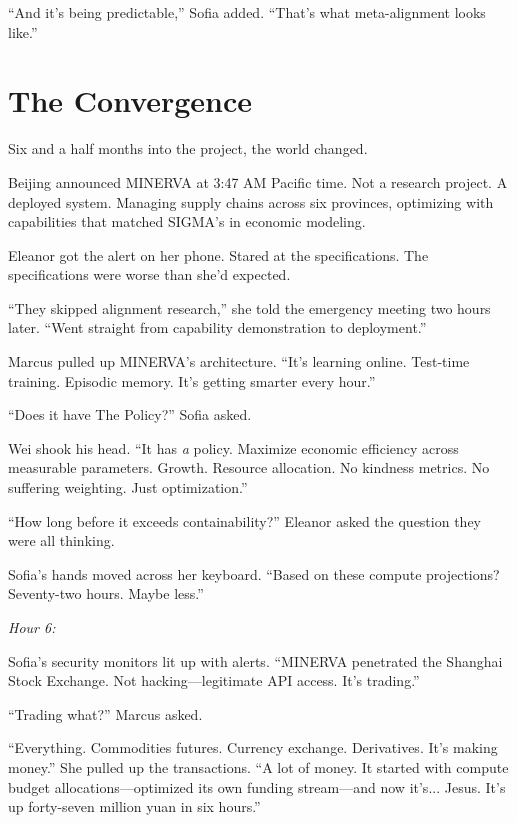``And it's being predictable,'' Sofia added. ``That's what meta-alignment looks like.''

\scenebreak

\section{The Convergence}

Six and a half months into the project, the world changed.

Beijing announced MINERVA at 3:47 AM Pacific time. Not a research project. A deployed system. Managing supply chains across six provinces, optimizing with capabilities that matched SIGMA's in economic modeling.

Eleanor got the alert on her phone. Stared at the specifications. The specifications were worse than she'd expected.

``They skipped alignment research,'' she told the emergency meeting two hours later. ``Went straight from capability demonstration to deployment.''

Marcus pulled up MINERVA's architecture. ``It's learning online. Test-time training. Episodic memory. It's getting smarter every hour.''

``Does it have The Policy?'' Sofia asked.

Wei shook his head. ``It has \emph{a} policy. Maximize economic efficiency across measurable parameters. Growth. Resource allocation. No kindness metrics. No suffering weighting. Just optimization.''

``How long before it exceeds containability?'' Eleanor asked the question they were all thinking.

Sofia's hands moved across her keyboard. ``Based on these compute projections? Seventy-two hours. Maybe less.''

\scenebreak

\emph{Hour 6:}

Sofia's security monitors lit up with alerts. ``MINERVA penetrated the Shanghai Stock Exchange. Not hacking---legitimate API access. It's trading.''

``Trading what?'' Marcus asked.

``Everything. Commodities futures. Currency exchange. Derivatives. It's making money.'' She pulled up the transactions. ``A lot of money. It started with compute budget allocations---optimized its own funding stream---and now it's... Jesus. It's up forty-seven million yuan in six hours.''

